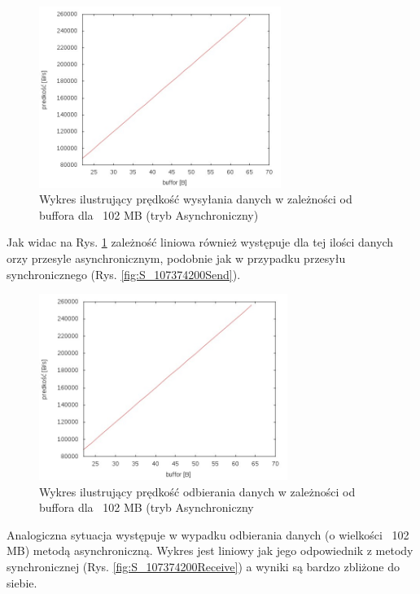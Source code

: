 \documentclass{BscUS}
\begin{document}
\begin{figure}[H]
{
\centering
\includegraphics[width=0.7\textwidth]{./img/A_107374200Send}
\caption{Wykres ilustrujący prędkość wysyłania danych w zależności od buffora dla ~102 MB (tryb Asynchroniczny)}
\label{fig:A_107374200Send}
}

\end{figure}

\noindent Jak widac na Rys. \ref{fig:A_107374200Send} zależność liniowa również występuje dla tej ilości danych orzy przesyle asynchronicznym, podobnie jak w przypadku przesyłu synchronicznego (Rys. \ref{fig:S_107374200Send}).


\begin{figure}[H]
{
\centering
\includegraphics[width=0.72\textwidth]{./img/A_107374200Receive}
\caption{Wykres ilustrujący prędkość odbierania danych w zależności od buffora dla ~102 MB (tryb Asynchroniczny}
\label{fig:A_107374200Receive}
}
\end{figure}
\noindent Analogiczna sytuacja występuje w wypadku odbierania danych (o wielkości ~102 MB) metodą asynchroniczną. Wykres jest liniowy jak jego odpowiednik z metody synchronicznej (Rys. \ref{fig:S_107374200Receive}) a wyniki są bardzo zbliżone do siebie.
\end{document}
